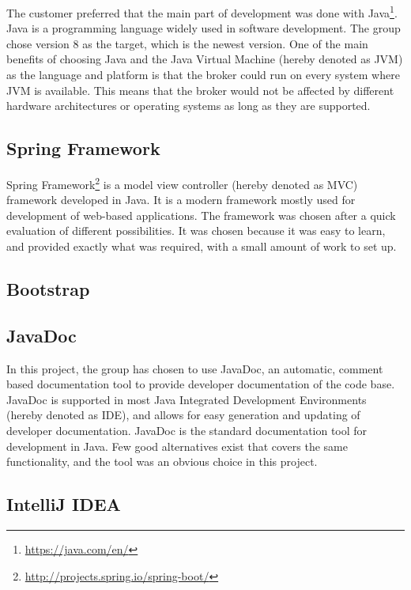 The customer preferred that the main part of development was done with Java\footnote{\url{https://java.com/en/}}. Java is a programming language widely used in software development. The group chose version 8 as the target, which is the newest version. One of the main benefits of choosing Java and the Java Virtual Machine (hereby denoted as JVM) as the language and platform is that the broker could run on every system where JVM is available. This means that the broker would not be affected by different hardware architectures or operating systems as long as they are supported.

\subsection{Spring Framework}
\label{subsec:prestudies-tools-spring_mvc}

Spring Framework\footnote{\url{http://projects.spring.io/spring-boot/}} is a model view controller (hereby denoted as MVC) framework developed in Java. It is a modern framework mostly used for development of web-based applications. The framework was chosen after a quick evaluation of different possibilities. It was chosen because it was easy to learn, and provided exactly what was required, with a small amount of work to set up.

\subsection{Bootstrap}
\label{subsec:prestudies-tools-bootstrap}

\subsection{JavaDoc}
\label{subsec:prestudies-tools-javadoc}

In this project, the group has chosen to use JavaDoc, an automatic, comment based documentation tool to provide developer documentation of the code base. JavaDoc is supported in most Java Integrated Development Environments (hereby denoted as IDE), and allows for easy generation and updating of developer documentation. JavaDoc is the standard documentation tool for development in Java. Few good alternatives exist that covers the same functionality, and the tool was an obvious choice in this project.

\subsection{IntelliJ IDEA}
\label{subsec:prestudies-tools-intellij_idea}

